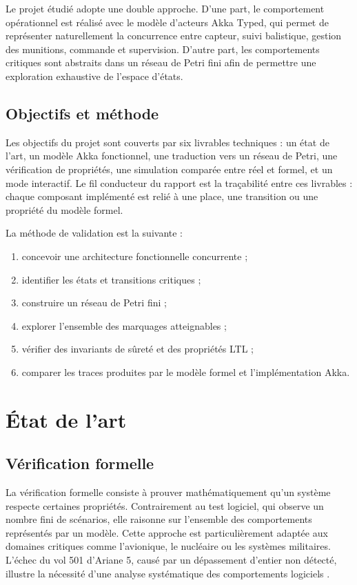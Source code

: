 \documentclass[11pt,a4paper]{report}
\begin{document}
Le projet étudié adopte une double approche. D'une part, le comportement opérationnel est réalisé avec le modèle d'acteurs Akka Typed, qui permet de représenter naturellement la concurrence entre capteur, suivi balistique, gestion des munitions, commande et supervision. D'autre part, les comportements critiques sont abstraits dans un réseau de Petri fini afin de permettre une exploration exhaustive de l'espace d'états.

\section{Objectifs et méthode}
Les objectifs du projet sont couverts par six livrables techniques : un état de l'art, un modèle Akka fonctionnel, une traduction vers un réseau de Petri, une vérification de propriétés, une simulation comparée entre réel et formel, et un mode interactif. Le fil conducteur du rapport est la traçabilité entre ces livrables : chaque composant implémenté est relié à une place, une transition ou une propriété du modèle formel.

La méthode de validation est la suivante :
\begin{enumerate}
  \item concevoir une architecture fonctionnelle concurrente ;
  \item identifier les états et transitions critiques ;
  \item construire un réseau de Petri fini ;
  \item explorer l'ensemble des marquages atteignables ;
  \item vérifier des invariants de sûreté et des propriétés LTL ;
  \item comparer les traces produites par le modèle formel et l'implémentation Akka.
\end{enumerate}

\chapter{État de l'art}

\section{Vérification formelle}
La vérification formelle consiste à prouver mathématiquement qu'un système respecte certaines propriétés. Contrairement au test logiciel, qui observe un nombre fini de scénarios, elle raisonne sur l'ensemble des comportements représentés par un modèle. Cette approche est particulièrement adaptée aux domaines critiques comme l'avionique, le nucléaire ou les systèmes militaires. L'échec du vol 501 d'Ariane 5, causé par un dépassement d'entier non détecté, illustre la nécessité d'une analyse systématique des comportements logiciels \citep{lions1996}.
\end{document}

